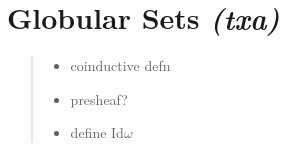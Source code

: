 \section{Globular Sets \textit{(txa)}}

\begin{quote}
  \begin{itemize}\item coinductive defn
  \item presheaf?
  \item define Id$\omega$
  \end{itemize}
 \end{quote}
 
